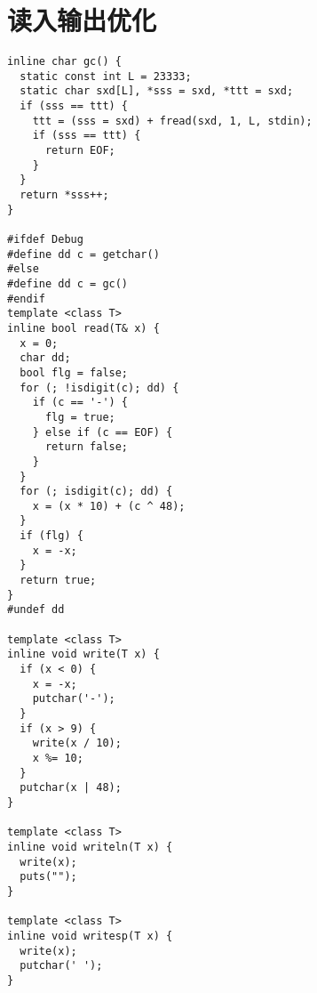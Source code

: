 \documentclass[a4paper,11pt,twoside,fontset = fandol,UTF8]{ctexbook} %
\begin{document}
\section{读入输出优化}
\begin{lstlisting}
inline char gc() {
  static const int L = 23333;
  static char sxd[L], *sss = sxd, *ttt = sxd;
  if (sss == ttt) {
    ttt = (sss = sxd) + fread(sxd, 1, L, stdin);
    if (sss == ttt) {
      return EOF;
    }
  }
  return *sss++;
}

#ifdef Debug
#define dd c = getchar()
#else
#define dd c = gc()
#endif
template <class T>
inline bool read(T& x) {
  x = 0;
  char dd;
  bool flg = false;
  for (; !isdigit(c); dd) {
    if (c == '-') {
      flg = true;
    } else if (c == EOF) {
      return false;
    }
  }
  for (; isdigit(c); dd) {
    x = (x * 10) + (c ^ 48);
  }
  if (flg) {
    x = -x;
  }
  return true;
}
#undef dd

template <class T>
inline void write(T x) {
  if (x < 0) {
    x = -x;
    putchar('-');
  }
  if (x > 9) {
    write(x / 10);
    x %= 10;
  }
  putchar(x | 48);
}

template <class T>
inline void writeln(T x) {
  write(x);
  puts("");
}

template <class T>
inline void writesp(T x) {
  write(x);
  putchar(' ');
}
\end{lstlisting}
  
\end{document}

